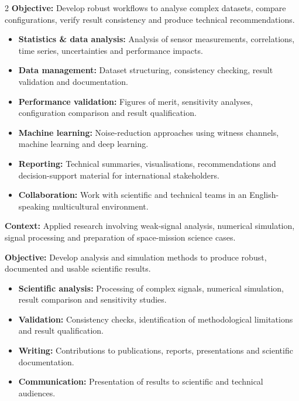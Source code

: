 \documentclass[8pt,a4paper,ragged2e,withhyper]{altacv}
\begin{document}
\begin{paracol}{2}
\textbf{Objective:} Develop robust workflows to analyse complex datasets, compare configurations, verify result consistency and produce technical recommendations.

\begin{itemize}
  \item \textbf{Statistics \& data analysis:} Analysis of sensor measurements, correlations, time series, uncertainties and performance impacts.
  \item \textbf{Data management:} Dataset structuring, consistency checking, result validation and documentation.
  \item \textbf{Performance validation:} Figures of merit, sensitivity analyses, configuration comparison and result qualification.
  \item \textbf{Machine learning:} Noise-reduction approaches using witness channels, machine learning and deep learning.
  \item \textbf{Reporting:} Technical summaries, visualisations, recommendations and decision-support material for international stakeholders.
  \item \textbf{Collaboration:} Work with scientific and technical teams in an English-speaking multicultural environment.
\end{itemize}

\divider


\textbf{Context:} Applied research involving weak-signal analysis, numerical simulation, signal processing and preparation of space-mission science cases.

\textbf{Objective:} Develop analysis and simulation methods to produce robust, documented and usable scientific results.

\begin{itemize}
  \item \textbf{Scientific analysis:} Processing of complex signals, numerical simulation, result comparison and sensitivity studies.
  \item \textbf{Validation:} Consistency checks, identification of methodological limitations and result qualification.
  \item \textbf{Writing:} Contributions to publications, reports, presentations and scientific documentation.
  \item \textbf{Communication:} Presentation of results to scientific and technical audiences.
\end{itemize}


\end{paracol}
\end{document}
